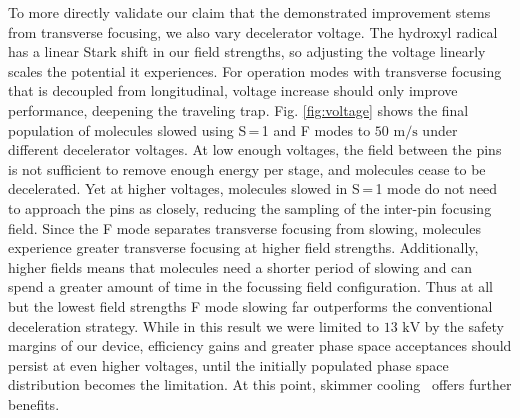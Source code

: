 \documentclass[%
 reprint,
 amsmath,amssymb,
 aps,
prl,
]{revtex4-1}
\begin{document}
To more directly validate our claim that the demonstrated improvement stems from transverse focusing, we also vary decelerator voltage.
The hydroxyl radical has a linear Stark shift in our field strengths, so adjusting the voltage linearly scales the potential it experiences.
For operation modes with transverse focusing that is decoupled from longitudinal, voltage increase should only improve performance, deepening the traveling trap.
Fig. \ref{fig:voltage} shows the final population of molecules slowed using S\,=\,1 and F modes to $50 \text{ m/s}$ under different decelerator voltages.
At low enough voltages, the field between the pins is not sufficient to remove enough energy per stage, and molecules cease to be decelerated.
Yet at higher voltages, molecules slowed in S\,=\,1 mode do not need to approach the pins as closely, reducing the sampling of the inter-pin focusing field.
Since the F mode separates transverse focusing from slowing, molecules experience greater transverse focusing at higher field strengths.
Additionally, higher fields means that molecules need a shorter period of slowing and can spend a greater amount of time in the focussing field configuration.
Thus at all but the lowest field strengths F mode slowing far outperforms the conventional deceleration strategy.
While in this result we were limited to $13 \text{ kV}$ by the safety margins of our device, efficiency gains and greater phase space acceptances should persist at even higher voltages, until the initially populated phase space distribution becomes the limitation.
At this point, skimmer cooling~\cite{Wu2018} offers further benefits.
\end{document}

